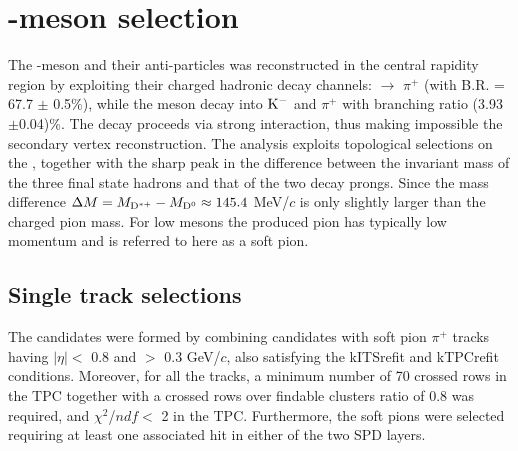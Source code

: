 \section{\Dstar -meson selection}
The \Dstar -meson and their anti-particles was reconstructed in the central rapidity region by exploiting their charged hadronic decay channels: \Dstar $\rightarrow$ \Dzero$\pi^{+}$ (with B.R. = 67.7 $\pm$ 0.5$\%$), while the \Dzero meson decay into $\rm K^-$ and $\pi^{+}$ with branching ratio (3.93$\pm$0.04)\%. The \Dstar decay proceeds via strong interaction, thus making impossible the secondary vertex reconstruction. The analysis exploits topological selections on the \Dzero,  together with the sharp peak in the difference between the invariant mass of the three final state hadrons and that of the two \Dzero decay prongs. Since the mass difference $\Delta M = M_{\rm D^{\ast +}} - M_{\rm D^0} \approx 145.4$ MeV/$c$ is only slightly larger than the charged pion mass. For low \pt \Dstar mesons the produced pion has typically low momentum and is referred to here as a soft pion.



\subsection{Single track selections}
\label{sec:single_track}

The \Dstar candidates were formed by combining \Dzero candidates with soft pion $\pi^{+}$ tracks having $|\eta| <$ 0.8 and \pt $>$ 0.3 GeV/$c$, also satisfying the kITSrefit and kTPCrefit conditions. Moreover, for all the tracks, a minimum number of 70 crossed rows in the TPC together with a crossed rows over findable clusters ratio of 0.8 was required, and $\chi^2$/$ndf <$ 2 in the TPC. Furthermore, the \Dstar soft pions were selected requiring at least one associated hit in either of the two SPD layers. 


